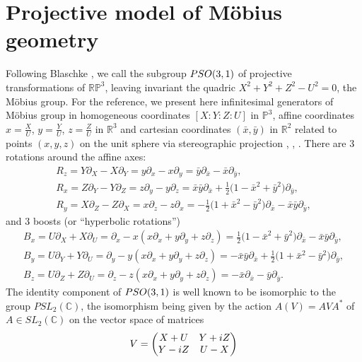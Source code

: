 \documentclass[11pt]{article}
\numberwithin{equation}{section}
\numberwithin{equation}{section}
\begin{document}
\section{Projective model of M\"obius geometry}
Following Blaschke \cite{B-29}, we call the subgroup ${\rm PSO}(3,1)$ of projective transformations of $\mathbb{RP}^3$, leaving invariant the quadric
$
X^2+Y^2+Z^2-U^2=0$,
the M\"obius group.
For the reference, we present here infinitesimal generators of M\"obius group in homogeneous coordinates $[X:Y:Z:U]$ in $\mathbb{P}^3$, affine coordinates $x=\frac{X}{U}$, $y=\frac{Y}{U}$, $ z=\frac{Z}{U}$ in $\mathbb{R}^3$ and cartesian coordinates $(\bar{x},\bar{y})$ in $\mathbb{R}^2$ related to points $(x,y,z)$ on the unit sphere via stereographic projection
, , .
There are 3 rotations around the affine axes:
\begin{gather*}
R_z=Y\partial_X-X\partial_Y=y\partial_x-x\partial_y=\bar{y}\partial_{\bar{x}}-\bar{x}\partial_{\bar{y}},\\
R_x=Z\partial_Y-Y\partial_Z=z\partial_y-y\partial_z=\bar{x}\bar{y}\partial_{\bar{x}}+\frac{1}{2} \bigl(1-\bar{x}^2+\bar{y}^2\bigr)\partial_{\bar{y}},\\
R_y=X\partial_Z-Z\partial_X=x\partial_z-z\partial_x=-\frac{1}{2} \bigl(1+\bar{x}^2-\bar{y}^2\bigr)\partial_{\bar{x}}-\bar{x}\bar{y}\partial_{\bar{y}},
\end{gather*}
and 3 boosts (or ``hyperbolic rotations'')
\begin{gather*}
B_x=U\partial_X+X\partial_U=\partial_x-x(x\partial_x+y\partial_y+z\partial_z)=\frac{1}{2} \bigl(1-\bar{x}^2+\bar{y}^2\bigr)\partial_{\bar{x}}-\bar{x}\bar{y}\partial_{\bar{y}},\\
B_y=U\partial_Y+Y\partial_U=\partial_y-y(x\partial_x+y\partial_y+z\partial_z)= -\bar{x}\bar{y}\partial_{\bar{x}}+\frac{1}{2} \bigl(1+\bar{x}^2-\bar{y}^2\bigr)\partial_{\bar{y}},\\
B_z=U\partial_Z+Z\partial_U=\partial_z-z(x\partial_x+y\partial_y+z\partial_z)=-\bar{x}\partial_{\bar{x}}-\bar{y}\partial_{\bar{y}}.
\end{gather*}
The identity component of ${\rm PSO}(3,1)$ is well known to be isomorphic to the group $PSL_2(\mathbb{C})$, the isomorphism being given by the action $A(V)=AVA^*$ of $A\in SL_2(\mathbb{C})$ on the vector space of
matrices
\[
V=\left(
\begin{matrix}
X+U & Y+{\rm i}Z\\
Y-{\rm i}Z & U-X
\end{matrix}
\right)
\]
\end{document}
